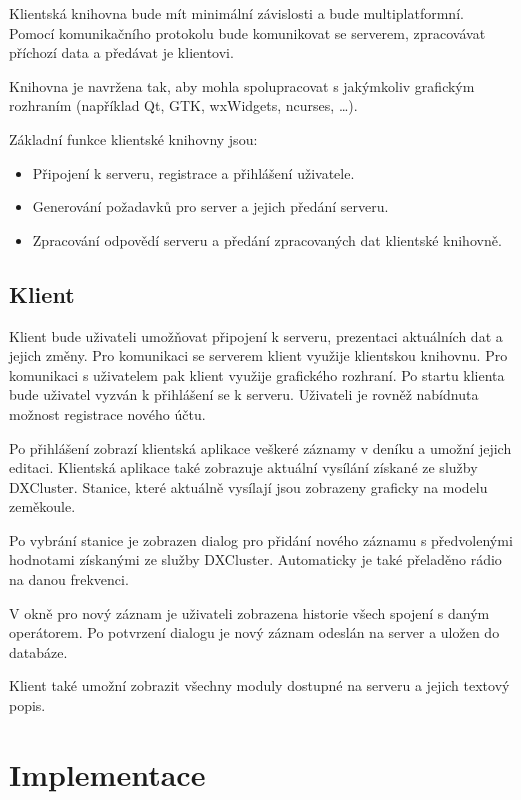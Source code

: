 Klientská knihovna bude mít minimální závislosti a bude multiplatformní. Pomocí komunikačního protokolu bude
komunikovat se serverem, zpracovávat příchozí data a předávat je klientovi.

Knihovna je navržena tak, aby mohla spolupracovat s jakýmkoliv grafickým
rozhraním (například Qt, GTK, wxWidgets, ncurses, \dots). %

Základní funkce klientské knihovny jsou:

\begin{itemize}
\item Připojení k serveru, registrace a přihlášení uživatele.
\item Generování požadavků pro server a jejich předání serveru.
\item Zpracování odpovědí serveru a předání zpracovaných dat klientské knihovně.
\end{itemize}

\section{Klient}
\label{navrh_klient}

Klient bude uživateli umožňovat připojení k serveru, prezentaci aktuálních dat a
jejich změny. Pro komunikaci
se serverem klient využije klientskou knihovnu. Pro komunikaci s uživatelem pak klient využije grafického rozhraní.
Po startu klienta bude uživatel vyzván k přihlášení se k serveru. Uživateli je rovněž nabídnuta možnost registrace
nového účtu.

Po přihlášení zobrazí klientská aplikace veškeré záznamy v deníku a umožní jejich editaci. Klientská aplikace také zobrazuje
aktuální vysílání získané ze služby DXCluster. Stanice, které aktuálně vysílají jsou zobrazeny graficky na modelu 
zeměkoule.

Po vybrání stanice je zobrazen dialog pro přidání nového záznamu s předvolenými hodnotami získanými ze služby DXCluster. Automaticky
je také přeladěno rádio na danou frekvenci.

V okně pro nový záznam je uživateli zobrazena historie všech spojení s daným operátorem.
Po potvrzení dialogu je nový záznam odeslán na server a uložen do databáze.

Klient také umožní zobrazit všechny moduly dostupné na serveru a jejich
textový popis.


\chapter{Implementace}
\label{implementace}

